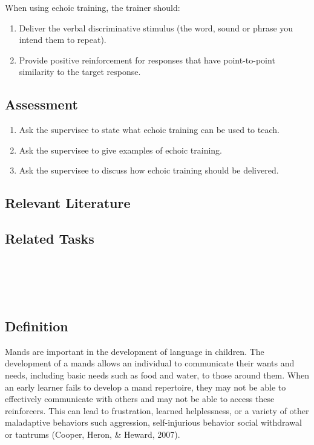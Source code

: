 When using echoic training, the trainer should:
\begin{enumerate}
\item Deliver the verbal discriminative stimulus (the word, sound or phrase you intend them to repeat).
\item Provide positive reinforcement for responses that have point-to-point similarity to the target response.  
\end{enumerate}
%
\subsection{Assessment}
\begin{enumerate}
\item Ask the supervisee to state what echoic training can be used to teach.
\item Ask the supervisee to give examples of echoic training.
\item Ask the supervisee to discuss how echoic training should be delivered.
\end{enumerate}
%
\subsection{Relevant Literature}
\begin{refsection}
\nocite{drash1999using,
    cooper2007applied,
    kodak2009acquisition,
    stock2008comparison,
    sundberg2008verbal,
    skinner1957verbal}
\printbibliography[heading=none]
\end{refsection}
%
\subsection{Related Tasks}
\fourdOne{}\\
\fourdFour{}\\
\fourFKFourtyThree{}\\
%
%
%
%
%
%
%
%
%
%
%
\section{\fourdEleven{}}
\subsection{Definition}
Mands are important in the development of language in children.  The development of a mands allows an individual to communicate their wants and needs, including basic needs such as food and water, to those around them.  When an early learner fails to develop a mand repertoire, they may not be able to effectively communicate with others and may not be able to access these reinforcers.  This can lead to frustration, learned helplessness, or a variety of other maladaptive behaviors such aggression, self-injurious behavior social withdrawal or tantrums (Cooper, Heron, \& Heward, 2007).

